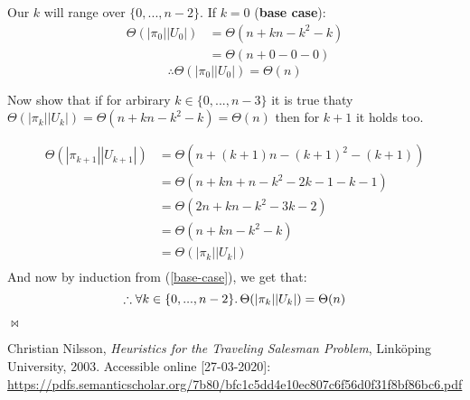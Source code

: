 \documentclass{article}
\newcommand{\qed}{\begin{flushright}$\bowtie$\end{flushright}}
\newcommand{\bb}[1]{\textbf{#1}}
\begin{document}
Our $k$ will range over $\{0,...,n-2\}$. If $k=0$ (\bb{base case}):
\begin{align*}
  \Theta(|\pi_0||U_0|) & = \Theta(n + kn - k^2 - k) \\
                       & = \Theta(n + 0 - 0 - 0)
\end{align*}
\begin{equation}
  \label{base-case}
  \therefore \Theta(|\pi_0||U_0|) = \Theta(n)
\end{equation}

Now show that if for arbirary $k\in\{0,...,n-3\}$ it is true thaty
$\Theta(|\pi_k||U_k|) = \Theta(n + kn - k^2 - k) = \Theta(n)$ then for
$k+1$ it holds too.

\begin{align*}
  \Theta(|\pi_{k+1}||U_{k+1}|) & = \Theta(n + (k+1)n - (k+1)^2 - (k+1)) \\
                               & = \Theta(n + kn + n - k^2 - 2k - 1 -k -1) \\
                               & = \Theta(2n + kn - k^2 - 3k - 2) \\
                               & = \Theta(n + kn - k^2 - k) \\
                               & = \Theta(|\pi_k||U_k|) \\
\end{align*}
And now by induction from (\ref*{base-case}), we get that:
\[ \therefore \forall k\in\{0,...,n-2\}\ldotp
  \Theta(|\pi_k||U_k|) = \Theta(n)\]
\qed



\begin{thebibliography}{9}
  Christian Nilsson,
  \textit{Heuristics for the Traveling Salesman Problem},
  Link\"oping University,
  2003.
  Accessible online [27-03-2020]: \url{https://pdfs.semanticscholar.org/7b80/bfc1c5dd4e10ec807c6f56d0f31f8bf86bc6.pdf}
\end{thebibliography}
\end{document}
